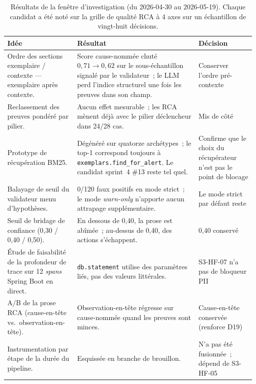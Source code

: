 \documentclass[11pt,a4paper,oneside]{report}
\begin{document}
\begin{table}[h]
\centering
\footnotesize
\begin{tabular}{p{} p{} p{}}
\toprule
\textbf{Idée} & \textbf{Résultat} & \textbf{Décision} \\
\midrule
Ordre des sections exemplaire / contexte --- exemplaire après
contexte. & Score cause-nommée chuté $0{,}71 \to 0{,}62$ sur le
sous-échantillon signalé par le validateur~; le LLM perd l'indice
structurel une fois les preuves dans son champ. & Conserver l'ordre
pré-contexte \\
\midrule
Reclassement des preuves pondéré par pilier. & Aucun effet
mesurable~; les RCA mènent déjà avec le pilier déclencheur dans
24/28 cas. & Mis de côté \\
\midrule
Prototype de récupération BM25. & Dégénéré sur quatorze
archétypes~; le top-1 correspond toujours à
\texttt{exemplars.find\_for\_alert}. Le candidat sprint~4 \#13
reste tel quel. & Confirme que le choix du récupérateur n'est pas
le point de blocage \\
\midrule
Balayage de seuil du validateur menu d'hypothèses. & 0/120 faux
positifs en mode strict~; le mode \emph{warn-only} n'apporte aucun
attrapage supplémentaire. & Le mode strict par défaut reste \\
\midrule
Seuil de bridage de confiance (0,30 / 0,40 / 0,50). & En dessous de
0,40, la prose est abîmée~; au-dessus de 0,40, des actions
s'échappent. & 0,40 conservé \\
\midrule
Étude de faisabilité de la profondeur de trace sur 12 \emph{spans}
Spring Boot en direct. & \texttt{db.statement} utilise des
paramètres liés, pas des valeurs littérales. & S3-HF-07 n'a pas de
bloqueur PII \\
\midrule
A/B de la prose RCA (cause-en-tête vs.\ observation-en-tête).
& Observation-en-tête régresse sur cause-nommée quand les preuves
sont minces. & Cause-en-tête conservée (renforce D19) \\
\midrule
Instrumentation par étape de la durée du pipeline. & Esquissée en
branche de brouillon. & N'a pas été fusionnée~; dépend de S3-HF-05 \\
\bottomrule
\end{tabular}
\caption{Résultats de la fenêtre d'investigation (du 2026-04-30 au
2026-05-19). Chaque candidat a été noté sur la grille de qualité
RCA à 4 axes sur un échantillon de vingt-huit décisions.}
\label{tab:investigation}
\end{table}
\end{document}
